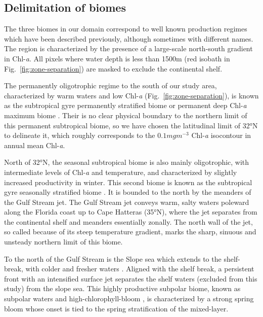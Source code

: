\subsection{Delimitation of biomes}

The three biomes in our domain correspond to well known production regimes which have been described previously, although sometimes with different names.
The region is characterized by the presence of a large-scale north-south gradient in Chl\nobreakdash-\emph{a}.
All pixels where water depth is less than 1500m (red isobath in Fig.~\ref{fig:zone-separation}) are masked to exclude the continental shelf.

The permanently oligotrophic regime to the south of our study area, characterized by warm waters and low Chl\nobreakdash-\emph{a} (Fig.~\ref{fig:zone-separation}), is known as the subtropical gyre permanently stratified biome \citep{sarmiento_2004} or permanent deep Chl\nobreakdash-\emph{a} maximum biome \citep{bock_2022}.
Their is no clear physical boundary to the northern limit of this permanent subtropical biome, so we have chosen the latitudinal limit of 32°N to delineate it, which roughly corresponds to the \(0.1 mg m^{-3}\) Chl\nobreakdash-\emph{a} isocontour in annual mean Chl\nobreakdash-\emph{a}.

North of 32°N, the seasonal subtropical biome is also mainly oligotrophic, with intermediate levels of Chl\nobreakdash-\emph{a} and temperature, and characterized by slightly increased productivity in winter.
This second biome is known as the subtropical gyre seasonally stratified biome \citep{sarmiento_2004}.
It is bounded to the north by the meanders of the Gulf Stream jet.
The Gulf Stream jet conveys warm, salty waters poleward along the Florida coast up to Cape Hatteras (35°N), where the jet separates from the continental shelf and meanders essentially zonally.
The north wall of the jet, so called because of its steep temperature gradient, marks the sharp, sinuous and unsteady northern limit of this biome.

To the north of the Gulf Stream is the Slope sea which extends to the shelf-break, with colder and fresher waters \citep{linder_1998}.
Aligned with the shelf break, a persistent front with an intensified surface jet separates the shelf waters (excluded from this study) from the slope sea.
This highly productive subpolar biome, known as subpolar waters \citep{sarmiento_2004} and high-chlorophyll-bloom \citep{bock_2022}, is characterized by a strong spring bloom whose onset is tied to the spring stratification of the mixed-layer.

